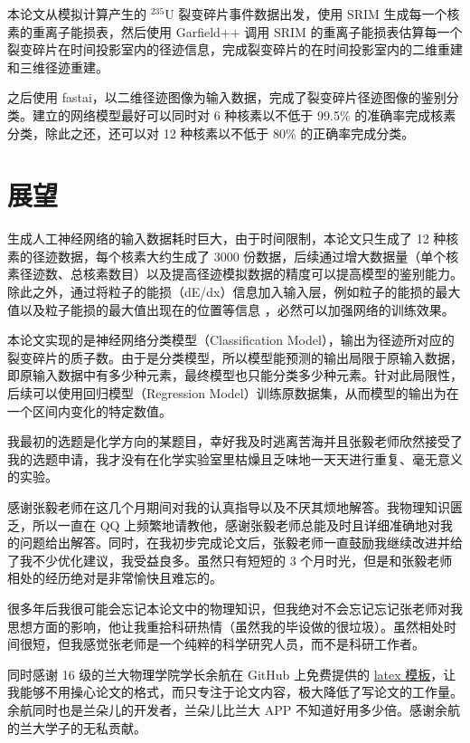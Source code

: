 \documentclass[AutoFakeBold]{LZUThesis}
\begin{document}
本论文从模拟计算产生的 $^{235}$U 裂变碎片事件数据出发，使用 SRIM 生成每一个核素的重离子能损表，然后使用 Garfield++ 调用 SRIM 的重离子能损表估算每一个裂变碎片在时间投影室内的径迹信息，完成裂变碎片的在时间投影室内的二维重建和三维径迹重建。

之后使用 fastai，以二维径迹图像为输入数据，完成了裂变碎片径迹图像的鉴别分类。建立的网络模型最好可以同时对 6 种核素以不低于 99.5\% 的准确率完成核素分类，除此之还，还可以对 12 种核素以不低于 80\% 的正确率完成分类。



\section{展望}
生成人工神经网络的输入数据耗时巨大，由于时间限制，本论文只生成了 12 种核素的径迹数据，每个核素大约生成了 3000 份数据，后续通过增大数据量（单个核素径迹数、总核素数目）以及提高径迹模拟数据的精度可以提高模型的鉴别能力。除此之外，通过将粒子的能损（dE/dx）信息加入输入层，例如粒子的能损的最大值以及粒子能损的最大值出现在的位置等信息 \cite{闫洋洋2018用于高精度裂变截面测量的时间投影室}，必然可以加强网络的训练效果。

本论文实现的是神经网络分类模型（Classification Model），输出为径迹所对应的裂变碎片的质子数。由于是分类模型，所以模型能预测的输出局限于原输入数据，即原输入数据中有多少种元素，最终模型也只能分类多少种元素。针对此局限性，后续可以使用回归模型（Regression Model）训练原数据集，从而模型的输出为在一个区间内变化的特定数值。


\backmatter


\printbib



\Thanks
我最初的选题是化学方向的某题目，幸好我及时逃离苦海并且张毅老师欣然接受了我的选题申请，我才没有在化学实验室里枯燥且乏味地一天天进行重复、毫无意义的实验。

感谢张毅老师在这几个月期间对我的认真指导以及不厌其烦地解答。我物理知识匮乏，所以一直在 QQ 上频繁地请教他，感谢张毅老师总能及时且详细准确地对我的问题给出解答。同时，在我初步完成论文后，张毅老师一直鼓励我继续改进并给了我不少优化建议，我受益良多。虽然只有短短的 3 个月时光，但是和张毅老师相处的经历绝对是非常愉快且难忘的。

很多年后我很可能会忘记本论文中的物理知识，但我绝对不会忘记忘记张老师对我思想方面的影响，他让我重拾科研热情（虽然我的毕设做的很垃圾）。虽然相处时间很短，但我感觉张老师是一个纯粹的科学研究人员，而不是科研工作者。

同时感谢 16 级的兰大物理学院学长余航在 GitHub 上免费提供的 \href{https://github.com/yuhlzu/LZUThesis2020}{latex 模板}，让我能够不用操心论文的格式，而只专注于论文内容，极大降低了写论文的工作量。余航同时也是兰朵儿的开发者，兰朵儿比兰大 APP 不知道好用多少倍。感谢余航的兰大学子的无私贡献。
\end{document}
